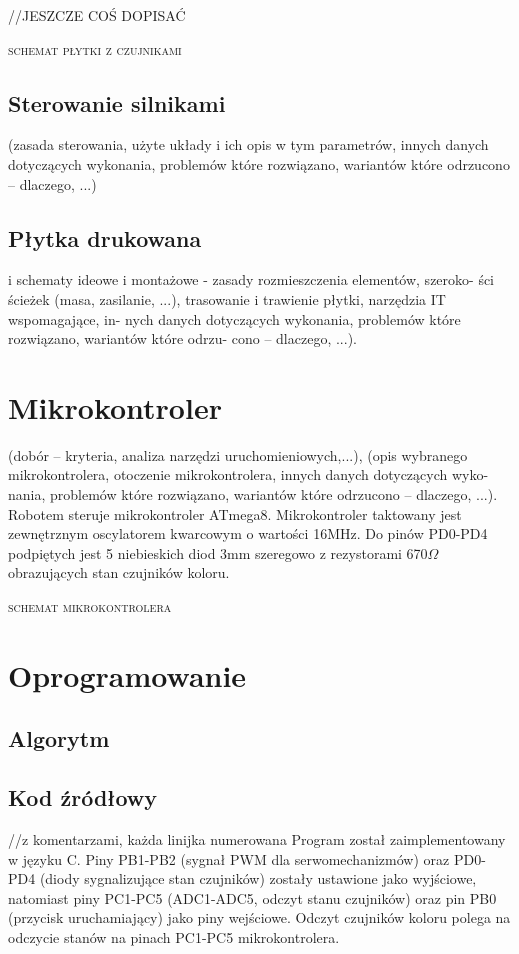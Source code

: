 \documentclass[11pt,a4paper]{article}
\begin{document}
  //JESZCZE COŚ DOPISAĆ
  
  \textsc{schemat płytki z czujnikami}

\subsection{Sterowanie silnikami}
(zasada sterowania, użyte układy i ich opis w tym parametrów, innych danych dotyczących
wykonania, problemów które rozwiązano, wariantów które odrzucono – dlaczego, ...)

\subsection{Płytka drukowana} i schematy ideowe i montażowe - zasady rozmieszczenia elementów, szeroko-
ści ścieżek (masa, zasilanie, ...), trasowanie i trawienie płytki, narzędzia IT wspomagające, in-
nych danych dotyczących wykonania, problemów które rozwiązano, wariantów które odrzu-
cono – dlaczego, ...).

\section{Mikrokontroler}
(dobór – kryteria, analiza narzędzi uruchomieniowych,...), (opis
wybranego mikrokontrolera, otoczenie mikrokontrolera, innych danych dotyczących wyko-
nania, problemów które rozwiązano, wariantów które odrzucono – dlaczego, ...).
  Robotem steruje mikrokontroler ATmega8.
  Mikrokontroler taktowany jest zewnętrznym oscylatorem kwarcowym o wartości 16MHz. Do pinów PD0-PD4 podpiętych jest 5 niebieskich diod 3mm szeregowo z rezystorami 670$\Omega$ obrazujących stan czujników koloru.
  
  \textsc{schemat mikrokontrolera}

\section{Oprogramowanie}
  \subsection{Algorytm}
  \subsection{Kod źródłowy}
//z komentarzami, każda linijka numerowana
  Program został zaimplementowany w języku C. Piny PB1-PB2 (sygnał PWM dla serwomechanizmów) oraz PD0-PD4 (diody sygnalizujące stan czujników) zostały ustawione jako wyjściowe, natomiast piny PC1-PC5 (ADC1-ADC5, odczyt stanu czujników) oraz pin PB0 (przycisk uruchamiający) jako piny wejściowe. Odczyt czujników koloru polega na odczycie stanów na pinach PC1-PC5 mikrokontrolera.
\end{document}
